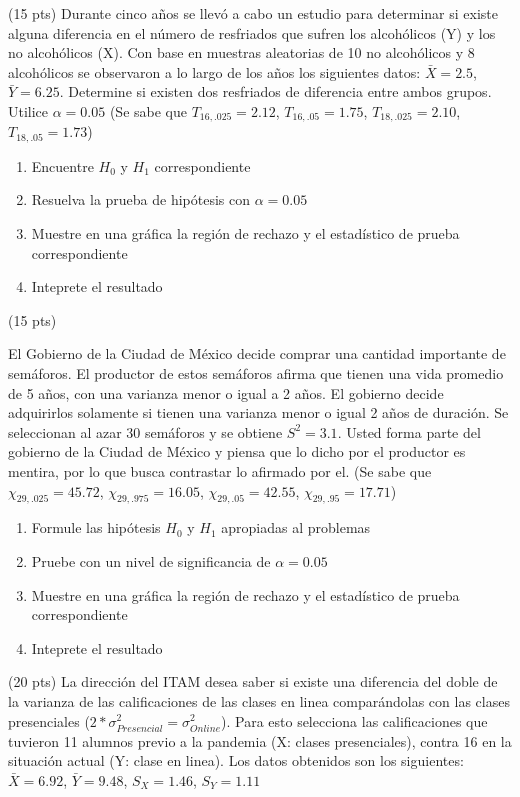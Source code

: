 \documentclass[addpoints]{exam}
\theoremstyle{mytheor}
\begin{document}
  
\begin{questions} 
 
\question (15 pts) Durante cinco años se llevó a cabo un estudio para determinar si existe alguna diferencia en el número de resfriados que sufren los alcohólicos (Y) y los no alcohólicos (X). Con base en muestras aleatorias de 10 no alcohólicos y 8 alcohólicos se observaron a lo largo de los años los siguientes datos: $\bar{X} = 2.5$, $\bar{Y} = 6.25$. Determine si existen dos resfriados de diferencia entre ambos grupos. Utilice $\alpha = 0.05$ (Se sabe que $T_{16,.025} = 2.12$, $T_{16,.05} = 1.75$, $T_{18,.025} = 2.10$, $T_{18,.05} = 1.73$)

\begin{enumerate}
\item Encuentre $H_0$ y $H_1$ correspondiente
\item Resuelva la prueba de hipótesis con $\alpha=0.05$
\item Muestre en una gráfica la región de rechazo y el estadístico de prueba correspondiente
\item Inteprete el resultado
\end{enumerate}
 
 
 \question (15 pts)

El Gobierno de la Ciudad de México decide comprar una cantidad importante de semáforos. El productor de estos semáforos afirma que tienen una vida promedio de 5 años, con una varianza menor o igual a 2 años. El gobierno decide adquirirlos solamente si tienen una varianza menor o igual 2 años de duración. Se seleccionan al azar 30 semáforos y se obtiene $S^2 = 3.1$. Usted forma parte del gobierno de la Ciudad de México y piensa que lo dicho por el productor es mentira, por lo que busca contrastar lo afirmado por el. (Se sabe que $\chi_{29,.025} = 45.72$, $\chi_{29,.975} = 16.05$, $\chi_{29,.05} = 42.55$, $\chi_{29,.95} = 17.71$)

\begin{enumerate}
\item Formule las hipótesis $H_0$ y $H_1$ apropiadas al problemas
\item Pruebe con un nivel de significancia de $\alpha = 0.05$
\item Muestre en una gráfica la región de rechazo y el estadístico de prueba correspondiente
\item Inteprete el resultado
\end{enumerate}

\question (20 pts)
La dirección del ITAM desea saber si existe una diferencia del doble de la varianza de las calificaciones de las clases en linea comparándolas con las clases presenciales ($2*\sigma^2_{Presencial} = \sigma^2_{Online}$). Para esto selecciona las calificaciones que tuvieron 11 alumnos previo a la pandemia (X: clases presenciales), contra 16 en la situación actual (Y: clase en linea). Los datos obtenidos son los siguientes: $\bar{X} = 6.92$, $\bar{Y} = 9.48$, $S_{X} = 1.46$, $S_{Y} = 1.11$


\end{questions}
\end{document}
